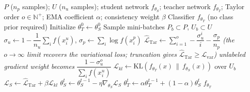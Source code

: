 \documentclass{article}
\begin{document}
\begin{algorithm}[!h]
\renewcommand{\algorithmicrequire}{\textbf{Input:}} %
\renewcommand{\algorithmicensure}{\textbf{Output:}} %
	\caption{Taylor variational loss with self-calibrated optimization (T-HOneCls)} %
	\begin{algorithmic}[1] %
	    \REQUIRE
	    $P$ ($n_{p}$ samples); $U$ ($n_{u}$ samples); student network $f_{\theta_{S}}$;
	    teacher network $f_{\theta_{T}}$; Taylor order $o\in\mathbb{N}^{+}$;
	    EMA coefficient $\alpha$; consistency weight $\beta$
	    \ENSURE
	    Classifier $f_{\theta_{T}}$ (no class prior required)
	    \STATE Initialize $\theta_{T}^{0}\leftarrow \theta_{S}^{0}$
	    \STATE Sample mini-batches $P_{b}\subset P$, $U_{b}\subset U$
	    \STATE $\sigma_{u}\leftarrow 1-\dfrac{1}{n_{u}}\sum_{i}f(x_{i}^{u})$,\qquad
	    $\sigma_{p}\leftarrow \sum_{i}\log f(x_{i}^{p})$
	    \STATE $\hat{\mathcal{L}}_{\mathrm{Tar}}\leftarrow \sum_{i=1}^{o}-\dfrac{\sigma_{u}^{i}}{i}-\dfrac{\sigma_{p}}{n_{p}}$ %
	    \STATE \quad\emph{(the $o\to\infty$ limit recovers the variational loss; truncation gives $\hat{\mathcal{L}}_{\mathrm{Tar}}\geq \mathcal{L}_{\mathrm{var}}$)} %
	    \STATE \quad\emph{unlabeled gradient weight becomes} $\dfrac{1-\sigma_{u}^{o}}{\sum_{i}f(x_{i}^{u})}$ %
	    \STATE $\mathcal{L}_{kl}\leftarrow \mathrm{KL}\!\left(f_{\theta_{T}}(x)\,\|\,f_{\theta_{S}}(x)\right)$ over $U_{b}$ %
	    \STATE $\mathcal{L}_{S}\leftarrow \hat{\mathcal{L}}_{\mathrm{Tar}}+\beta\mathcal{L}_{kl}$
	    \STATE $\theta_{S}^{t}\leftarrow \theta_{S}^{t-1}-\eta\nabla_{\theta_{S}}\mathcal{L}_{S}$
	    \STATE $\theta_{T}^{t}\leftarrow \alpha\theta_{T}^{t-1}+(1-\alpha)\theta_{S}^{t}$ %
	    \ENDFOR
		\RETURN $f_{\theta_{T}}$
	\end{algorithmic}
\end{algorithm}
\end{document}
